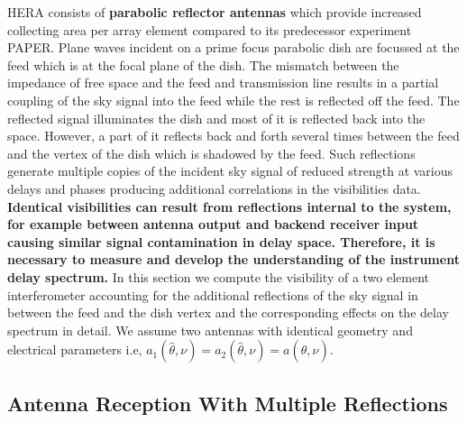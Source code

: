 \documentclass[twocolumn]{emulateapj}
\newcommand{\bmvolt}{{a}}
\newcommand{\thhat}{{\hat\theta}}
\begin{document}
    HERA consists of \textbf{parabolic reflector antennas} which
    provide increased collecting area per array element compared to its predecessor
    experiment PAPER. Plane waves incident on a prime focus parabolic dish are focussed at the
    feed which is at the focal plane of the dish.  The mismatch between the
    impedance of free space and the feed and transmission line results in a partial
    coupling of the sky signal into the feed while the rest is reflected off the
    feed.  The reflected signal illuminates the dish and most of it is reflected
    back into the space.  However, a part of it reflects back and forth several
    times between the feed and the vertex of the dish which is shadowed by the
    feed.  Such reflections generate multiple copies of the incident sky signal of
    reduced strength at various delays and phases producing additional
    correlations in the visibilities data.  \textbf{Identical
    visibilities can result from reflections internal to the system,
    for example between antenna output and backend receiver input causing similar signal contamination in delay space. Therefore, it is necessary to measure and develop the
    understanding of the instrument delay spectrum.}  In this section we compute the visibility
    of a two element interferometer accounting for the additional reflections of
    the sky signal in between the feed and the dish vertex and the corresponding
    effects on the delay spectrum in detail. We assume two antennas with identical
    geometry and electrical parameters i.e,
    $\bmvolt_{1}(\thhat,\nu)=\bmvolt_{2}(\thhat,\nu) = \bmvolt(\thhat,\nu)$. 
    
     \subsection{Antenna Reception With Multiple Reflections}
    \label{sec:multiple}
    
\end{document}
